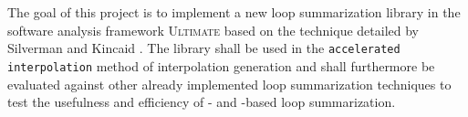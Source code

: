 
The goal of this project is to implement a new loop summarization library in the software analysis framework \textsc{Ultimate}\cite{Zitat02} based on the technique detailed by Silverman and Kincaid \cite{10.1007/978-3-030-25543-5_7}. The library shall be used in the \texttt{accelerated interpolation} method of interpolation generation and shall furthermore be evaluated against other already implemented loop summarization techniques to test the usefulness and efficiency of \qvasr- and \qvasrs-based loop summarization.